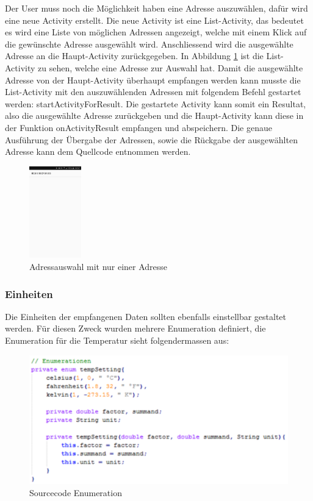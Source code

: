 Der User muss noch die Möglichkeit haben eine Adresse auszuwählen, dafür wird eine neue Activity erstellt. Die neue Activity ist eine List-Activity, das bedeutet es wird eine Liste von möglichen Adressen angezeigt, welche mit einem Klick auf die gewünschte Adresse ausgewählt wird. Anschliessend wird die ausgewählte Adresse an die Haupt-Activity zurückgegeben. In Abbildung \ref{BLEadressauswahl} ist die List-Activity zu sehen, welche eine Adresse zur Auswahl hat. Damit die ausgewählte Adresse von der Haupt-Activity überhaupt empfangen werden kann musste die List-Activity mit den auszuwählenden Adressen mit folgendem Befehl gestartet werden: startActivityForResult. Die gestartete Activity kann somit ein Resultat, also die ausgewählte Adresse zurückgeben und die Haupt-Activity kann diese in der Funktion onActivityResult empfangen und abspeichern. Die genaue Ausführung der Übergabe der Adressen, sowie die Rückgabe der ausgewählten Adresse kann dem Quellcode entnommen werden.

\begin{figure}[ht]
    \includegraphics[width=0.2\textwidth]{3Vorgehen/imag/BLEAdresseAuswaehlen.png}
    \caption{Adressauswahl mit nur einer Adresse}
	\label{BLEadressauswahl} 
\end{figure}



\subsubsection{Einheiten}

Die Einheiten der empfangenen Daten sollten ebenfalls einstellbar gestaltet werden. Für diesen Zweck wurden mehrere Enumeration definiert, die Enumeration für die Temperatur sieht folgendermassen aus:

\begin{figure}[ht]
    \includegraphics[width=1.0\textwidth]{3Vorgehen/imag/app_tempSetting.png}
    \caption{Sourcecode Enumeration}
	\label{app_tempSetting} 
\end{figure}

